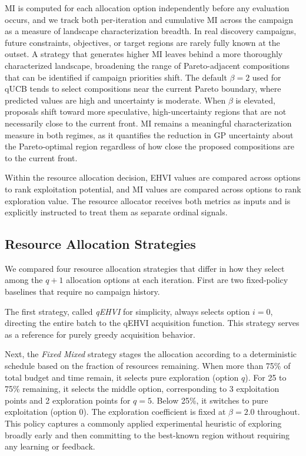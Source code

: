 \begin{itemize}
    MI is computed for each allocation option independently before any evaluation occurs, and we track both per-iteration and cumulative MI across the campaign as a measure of landscape characterization breadth. In real discovery campaigns, future constraints, objectives, or target regions are rarely fully known at the outset. A strategy that generates higher MI leaves behind a more thoroughly characterized landscape, broadening the range of Pareto-adjacent compositions that can be identified if campaign priorities shift. The default $\beta = 2$ used for qUCB tends to select compositions near the current Pareto boundary, where predicted values are high and uncertainty is moderate. When $\beta$ is elevated, proposals shift toward more speculative, high-uncertainty regions that are not necessarily close to the current front. MI remains a meaningful characterization measure in both regimes, as it quantifies the reduction in GP uncertainty about the Pareto-optimal region regardless of how close the proposed compositions are to the current front.

\end{itemize}

Within the resource allocation decision, EHVI values are compared across options to rank exploitation potential, and MI values are compared across options to rank exploration value. The resource allocator receives both metrics as inputs and is explicitly instructed to treat them as separate ordinal signals.

\subsection{Resource Allocation Strategies}
\label{sec:strategies}

We compared four resource allocation strategies that differ in how they select among the $q+1$ allocation options at each iteration. First are two fixed-policy baselines that require no campaign history.

The first strategy, called \textit{qEHVI} for simplicity, always selects option $i = 0$, directing the entire batch to the qEHVI acquisition function. This strategy serves as a reference for purely greedy acquisition behavior.

Next, the \textit{Fixed Mixed} strategy stages the allocation according to a deterministic schedule based on the fraction of resources remaining. When more than 75\% of total budget and time remain, it selects pure exploration (option $q$). For 25 to 75\% remaining, it selects the middle option, corresponding to 3 exploitation points and 2 exploration points for $q=5$. Below 25\%, it switches to pure exploitation (option 0). The exploration coefficient is fixed at $\beta = 2.0$ throughout. This policy captures a commonly applied experimental heuristic of exploring broadly early and then committing to the best-known region without requiring any learning or feedback.

